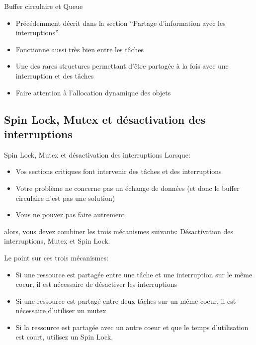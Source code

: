 \begin{frame}[fragile]{Buffer circulaire et Queue}
  \begin{itemize}
  \item  Précédemment décrit dans  la section  ``Partage d'information
    avec les interruptions''
  \item Fonctionne aussi très bien entre les tâches
  \item Une  des rares structures  permettant d'être partagée à  la fois
    avec une interruption et des tâches
  \item Faire attention à l'allocation dynamique des objets
  \end{itemize}
\end{frame}

\subsection{Spin Lock, Mutex et désactivation des interruptions}

\begin{frame}[fragile]{Spin Lock, Mutex et désactivation des interruptions}
  Lorsque:
  \begin{itemize}
  \item  Vos  sections critiques  font  intervenir  des  tâches et  des
    interruptions
  \item Votre problème ne concerne  pas un échange de données (et donc
    le buffer circulaire n'est pas une solution)
  \item Vous ne pouvez pas faire autrement
  \end{itemize}
  alors,   vous  devez   combiner  les   trois   mécanismes  suivants:
  Désactivation des interruptions, Mutex et Spin Lock.

  Le point sur ces trois mécanismes:
  \begin{itemize}
  \item  Si  une  ressource  est   partagée  entre  une  tâche  et  une
    interruption sur  le même coeur,  il est nécessaire  de désactiver
    les interruptions
  \item  Si une ressource  est partagé  entre deux  tâches sur  un même
    coeur, il est nécessaire d'utiliser un mutex
  \item Si  la ressource est  partagée avec un  autre coeur et  que le
    temps d'utilisation est court, utilisez un Spin Lock.
  \end{itemize}
\end{frame}

